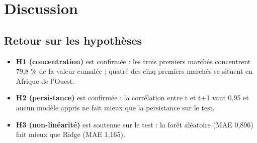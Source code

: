 \documentclass[11pt,a4paper]{article}
\begin{document}
\section{Discussion}\label{sec:discussion}
\subsection{Retour sur les hypothèses}
\begin{itemize}
\item \textbf{H1 (concentration)} est confirmée : les trois premiers marchés concentrent 79,8 \% de la valeur cumulée ; quatre des cinq premiers marchés se situent en Afrique de l'Ouest.
\item \textbf{H2 (persistance)} est confirmée : la corrélation entre t et t+1 vaut 0,95 et aucun modèle appris ne fait mieux que la persistance sur le test.
\item \textbf{H3 (non-linéarité)} est soutenue sur le test : la forêt aléatoire (MAE 0,896) fait mieux que Ridge (MAE 1,165).
\end{itemize}
\end{document}
